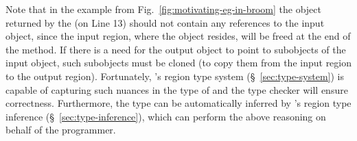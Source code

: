 



 Note that in the example from
Fig.~\ref{fig:motivating-eg-in-broom} the object returned by the
 (on Line 13) should not contain any references to the
input object, since the input region, where the object resides, will
be freed at the end of the method. If there is a need for the output
object to point to subobjects of the input object, such subobjects
must be cloned (to copy them from the input region to the output
region).  Fortunately, \name's region type system
(\S~\ref{sec:type-system}) is capable of capturing such nuances in the
type of  and the type checker will ensure correctness.
Furthermore, the type can be automatically inferred by \name's region
type inference (\S~\ref{sec:type-inference}), which can perform the
above reasoning on behalf of the programmer.


